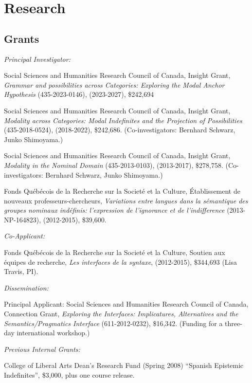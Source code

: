 \documentclass[11pt]{article}
\begin{document}
\section*{Research}

\subsection*{Grants}

\textit{Principal Investigator:}

 Social Sciences and Humanities Research
Council of Canada, Insight Grant, \textit{Grammar and possibilities across Categories: Exploring
the Modal Anchor Hypothesis} (435-2023-0146), (2023-2027), \$242,694

 Social Sciences and Humanities Research
Council of Canada, Insight Grant, \textit{Modality across Categories: Modal Indefinites and the Projection of Possibilities} (435-2018-0524), (2018-2022), \$242,686. (Co-investigators:
Bernhard Schwarz, Junko Shimoyama.)

 Social Sciences and Humanities Research
Council of Canada, Insight Grant, \textit{Modality in the Nominal
  Domain} (435-2013-0103), (2013-2017), \$278,758. (Co-investigators:
Bernhard Schwarz, Junko Shimoyama.)

Fonds Qu\'eb\'ecois de la Recherche sur la
Societ\'e et la Culture, \'Etablissement de
nouveaux professeurs-chercheurs, \textit{Variations
  entre langues dans la s\'emantique des groupes nominaux ind\'efinis:
  l'expression de l'ignorance et de l'indifference} (2013-NP-164823),
(2012-2015), \$39,600.


\textit{Co-Applicant:} 

Fonds Qu\'eb\'ecois de la Recherche sur la
Societ\'e et la Culture, Soutien aux \'equipes de recherche,
\textit{Les interfaces de la syntaxe}, (2012-2015), \$344,693 (Lisa
Travis, PI).

\textit{Dissemination:}

Principal Applicant: Social Sciences and Humanities Research Council
of Canada, Connection Grant, \textit{Exploring the Interfaces:
  Implicatures, Alternatives and the Semantics/Pragmatics Interface}
(611-2012-0232), \$16,342. (Funding for a three-day international workshop.)



\textit{Previous Internal Grants:}

College of Liberal Arts Dean's Research Fund (Spring 2008) ``Spanish Epistemic Indefinites'', \$3,000, plus one course release.
\end{document}
